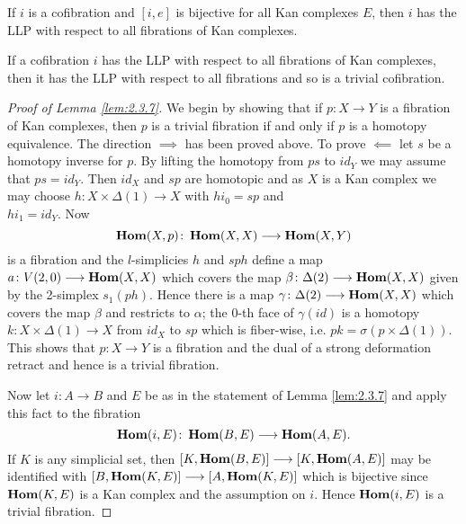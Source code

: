 \documentclass[../main]{subfiles}
\begin{document}
\begin{lemma}\label{lem:2.3.7}
If $i$ is a cofibration and $[i, e]$ is bijective for all Kan complexes $E$, then $i$ has the LLP with respect to all fibrations of Kan complexes. 
\end{lemma}

\begin{lemma}\label{lem:2.3.8}
If a cofibration $i$ has the LLP with respect to all fibrations of Kan complexes, then it has the LLP with respect to all fibrations and so is a trivial cofibration.
\end{lemma}

\begin{proof}[Proof of Lemma \ref{lem:2.3.7}]
We begin by showing that if $p \colon X \longrightarrow Y$ is a fibration of Kan complexes, then $p$ is a trivial fibration if and only if $p$ is a homotopy equivalence. The direction $\implies$ has been proved above. To prove $\impliedby$ let $s$ be a homotopy inverse for $p$. By lifting the homotopy from $ps$ to $id_{Y}$ we may assume that $ps = id_{Y}$. Then $id_{X}$ and $sp$ are homotopic and as $X$ is a Kan complex we may choose $h \colon X \times \Delta (1) \longrightarrow X$ with $hi_{0} = sp$ and \\ $hi_{1} = id_{Y}$. Now 
\[\operatorname{\mathbf{Hom}} (X, p) \colon \operatorname{\mathbf{Hom}} (X, X) \longrightarrow \operatorname{\mathbf{Hom}} (X, Y)\] is a fibration and the $l$-simplicies $h$ and $sph$ define a map $a \colon V (2, 0) \longrightarrow \operatorname{\mathbf{Hom}} (X, X)$ which covers the map $\beta \colon \Delta (2) \longrightarrow \operatorname{\mathbf{Hom}} (X, X)$ given by the 2-simplex $s_1(ph)$. Hence there is a map $\gamma \colon \Delta (2) \longrightarrow \operatorname{\mathbf{Hom}} (X, X)$ which covers the map $\beta$ and restricts to $\alpha $; the $0$-th face of $\gamma(id)$ is a homotopy $k \colon X \times \Delta (1) \longrightarrow X$ from $id_{X}$ to $sp$ which is fiber-wise, i.e. $pk = \sigma (p \times \Delta (1))$. This shows that $p \colon X \longrightarrow Y$ is a fibration and the dual of a strong deformation retract and hence is a trivial fibration. 

Now let $i \colon A \longrightarrow B$ and $E$ be as in the statement of Lemma \ref{lem:2.3.7} and apply this fact to the fibration \[\operatorname{\mathbf{Hom}} (i, E) \colon \operatorname{\mathbf{Hom}} (B, E) \longrightarrow \operatorname{\mathbf{Hom}} (A, E).\] If $K$ is any simplicial set, then $[K, \operatorname{\mathbf{Hom}} (B,E)] \longrightarrow [K, \operatorname{\mathbf{Hom}} (A,E)]$ may be identified with $[B, \operatorname{\mathbf{Hom}} (K,E)] \longrightarrow [A, \operatorname{\mathbf{Hom}} (K, E)]$ which is bijective since $\operatorname{\mathbf{Hom}} (K, E)$ is a Kan complex and the assumption on $i$. Hence $\operatorname{\mathbf{Hom}} (i, E)$ is a trivial fibration.


\end{proof}
\end{document}
